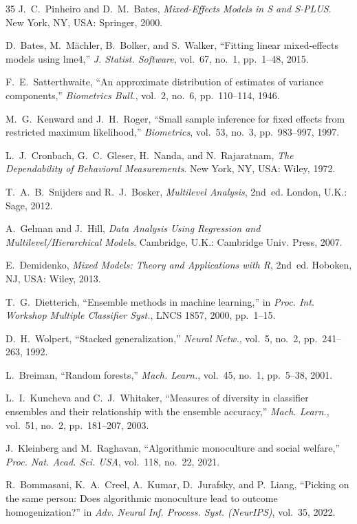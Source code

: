 \documentclass{ieeeaccess}
\theoremstyle{definition}
\theoremstyle{plain}
\begin{document}
\begin{thebibliography}{35}
 J.~C.~Pinheiro and D.~M.~Bates, \emph{Mixed-Effects
Models in S and S-PLUS}. New York, NY, USA: Springer, 2000.

 D.~Bates, M.~M\"{a}chler, B.~Bolker, and S.~Walker,
``Fitting linear mixed-effects models using lme4,'' \emph{J. Statist.
Software}, vol.~67, no.~1, pp.~1--48, 2015.

 F.~E.~Satterthwaite, ``An approximate distribution
of estimates of variance components,'' \emph{Biometrics Bull.}, vol.~2, no.~6,
pp.~110--114, 1946.

 M.~G.~Kenward and J.~H.~Roger, ``Small sample inference
for fixed effects from restricted maximum likelihood,'' \emph{Biometrics},
vol.~53, no.~3, pp.~983--997, 1997.

 L.~J.~Cronbach, G.~C.~Gleser, H.~Nanda, and
N.~Rajaratnam, \emph{The Dependability of Behavioral Measurements}. New York, NY,
USA: Wiley, 1972.

 T.~A.~B.~Snijders and R.~J.~Bosker, \emph{Multilevel
Analysis}, 2nd~ed. London, U.K.: Sage, 2012.

 A.~Gelman and J.~Hill, \emph{Data Analysis Using Regression
and Multilevel/Hierarchical Models}. Cambridge, U.K.: Cambridge Univ. Press, 2007.

 E.~Demidenko, \emph{Mixed Models: Theory and Applications
with R}, 2nd~ed. Hoboken, NJ, USA: Wiley, 2013.

 T.~G.~Dietterich, ``Ensemble methods in machine
learning,'' in \emph{Proc. Int. Workshop Multiple Classifier Syst.}, LNCS 1857,
2000, pp.~1--15.

 D.~H.~Wolpert, ``Stacked generalization,'' \emph{Neural
Netw.}, vol.~5, no.~2, pp.~241--263, 1992.

 L.~Breiman, ``Random forests,'' \emph{Mach. Learn.},
vol.~45, no.~1, pp.~5--38, 2001.

 L.~I.~Kuncheva and C.~J.~Whitaker, ``Measures of
diversity in classifier ensembles and their relationship with the ensemble
accuracy,'' \emph{Mach. Learn.}, vol.~51, no.~2, pp.~181--207, 2003.

 J.~Kleinberg and M.~Raghavan, ``Algorithmic monoculture
and social welfare,'' \emph{Proc. Nat. Acad. Sci. USA}, vol.~118, no.~22,
2021.

 R.~Bommasani, K.~A.~Creel, A.~Kumar, D.~Jurafsky, and
P.~Liang, ``Picking on the same person: Does algorithmic monoculture lead to
outcome homogenization?'' in \emph{Adv. Neural Inf. Process. Syst. (NeurIPS)},
vol.~35, 2022.


\end{thebibliography}
\end{document}
